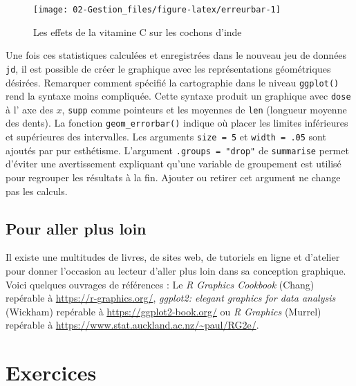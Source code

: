 \documentclass[
]{book}
\begin{document}
\begin{figure}

{\centering \texttt{[image: 02-Gestion\_files/figure-latex/erreurbar-1]} 

}

\caption{Les effets de la vitamine C sur les cochons d'inde}\label{fig:erreurbar}
\end{figure}

Une fois ces statistiques calculées et enregistrées dans le nouveau jeu de données \texttt{jd}, il est possible de créer le graphique avec les représentations géométriques désirées. Remarquer comment spécifié la cartographie dans le niveau \texttt{ggplot()} rend la syntaxe moins compliquée. Cette syntaxe produit un graphique avec \texttt{dose} à l' axe des \(x\), \texttt{supp} comme pointeurs et les moyennes de \texttt{len} (longueur moyenne des dents). La fonction \texttt{geom\_errorbar()} indique où placer les limites inférieures et supérieures des intervalles. Les arguments \texttt{size\ =\ 5} et \texttt{width\ =\ .05} sont ajoutés par pur esthétisme. L'argument \texttt{.groups\ =\ "drop"} de \texttt{summarise} permet d'éviter une avertissement expliquant qu'une variable de groupement est utilisé pour regrouper les résultats à la fin. Ajouter ou retirer cet argument ne change pas les calculs.

\hypertarget{pour-aller-plus-loin}{%
\section{Pour aller plus loin}\label{pour-aller-plus-loin}}

Il existe une multitudes de livres, de sites web, de tutoriels en ligne et d'atelier pour donner l'occasion au lecteur d'aller plus loin dans sa conception graphique. Voici quelques ouvrages de références : Le \emph{R Graphics Cookbook} (Chang) repérable à \url{https://r-graphics.org/}, \emph{ggplot2: elegant graphics for data analysis} (Wickham) repérable à \url{https://ggplot2-book.org/} ou \emph{R Graphics} (Murrel) repérable à \url{https://www.stat.auckland.ac.nz/~paul/RG2e/}.

\hypertarget{exercice-gestion}{%
\chapter*{Exercices}\label{exercice-gestion}}
\end{document}
